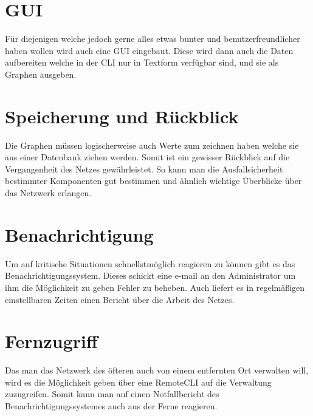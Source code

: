 \documentclass[10pt,a4paper]{report}
\begin{document}
\section{GUI}
Für diejenigen welche jedoch gerne alles etwas bunter und benutzerfreundlicher haben wollen wird auch eine GUI eingebaut. Diese wird dann auch die Daten aufbereiten welche in der CLI nur in Textform verfügbar sind, und sie als Graphen ausgeben. 
\section{Speicherung und Rückblick}
Die Graphen müssen logischerweise auch Werte zum zeichnen haben welche sie aus einer Datenbank ziehen werden. Somit ist ein gewisser Rückblick auf die Vergangenheit des Netzes gewährleistet. So kann man die Ausfallsicherheit bestimmter Komponenten gut bestimmen und ähnlich wichtige Überblicke über das Netzwerk erlangen.
\section{Benachrichtigung}
Um auf kritische Situationen schnellstmöglich reagieren zu können gibt es das Benachrichtigungssystem. Dieses schickt eine e-mail an den Administrator um ihm die Möglichkeit zu geben Fehler zu beheben. Auch liefert es in regelmäßigen einstellbaren Zeiten einen Bericht über die Arbeit des Netzes. 
\section{Fernzugriff}
Das man das Netzwerk des öfteren auch von einem entfernten Ort verwalten will, wird es die Möglichkeit geben über eine RemoteCLI auf die Verwaltung zuzugreifen. Somit kann man auf einen Notfallbericht des Benachrichtigungssystemes auch aus der Ferne reagieren. 
\end{document}
